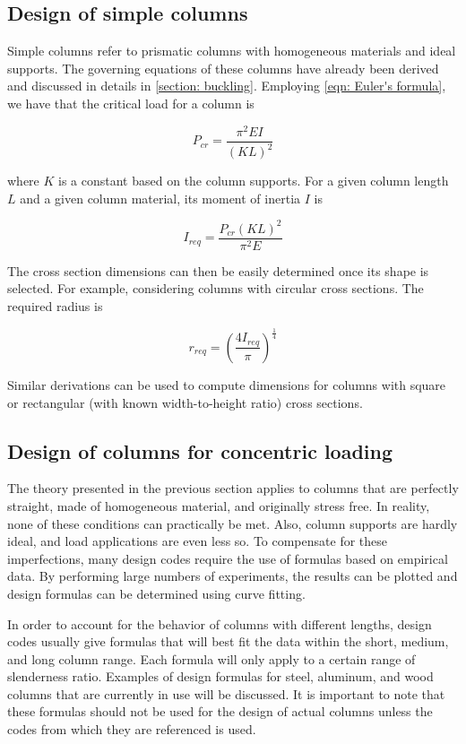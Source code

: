 \documentclass[
10pt,
a4paper,
openany,
svgnames,
]{book}
\begin{document}
\subsection{Design of simple columns}

Simple columns refer to prismatic columns with homogeneous materials and ideal supports. The governing equations of these columns have already been derived and discussed in details in \cref{section: buckling}. Employing \cref{eqn: Euler's formula}, we have that the critical load for a column is

\[P_{cr} = \frac{\pi ^2EI}{(KL)^2}\]

where $K$ is a constant based on the column supports. For a given column length $L$ and a given column material, its moment of inertia $I$ is

\begin{equation}
  I_{req} = \frac{P_{cr}(KL)^2}{\pi ^2E}
\end{equation}

The cross section dimensions can then be easily determined once its shape is selected. For example, considering columns with circular cross sections. The required radius is

\begin{equation}
  r_{req} = \left( \frac{4I_{req}}{\pi } \right)^{\frac{1}{4}}
\end{equation}

Similar derivations can be used to compute dimensions for columns with square or rectangular (with known width-to-height ratio) cross sections.

\subsection{Design of columns for concentric loading} \label{subsection: column concentric loading}

The theory presented in the previous section applies to columns that are perfectly straight, made of homogeneous material, and originally stress free. In reality, none of these conditions can practically be met. Also, column supports are hardly ideal, and load applications are even less so. To compensate for these imperfections, many design codes require the use of formulas based on empirical data. By performing large numbers of experiments, the results can be plotted and design formulas can be determined using curve fitting.

In order to account for the behavior of columns with different lengths, design codes usually give formulas that will best fit the data within the short, medium, and long column range. Each formula will only apply to a certain range of slenderness ratio. Examples of design formulas for steel, aluminum, and wood columns that are currently in use will be discussed. It is important to note that these formulas should not be used for the design of actual columns unless the codes from which they are referenced is used.
\end{document}
